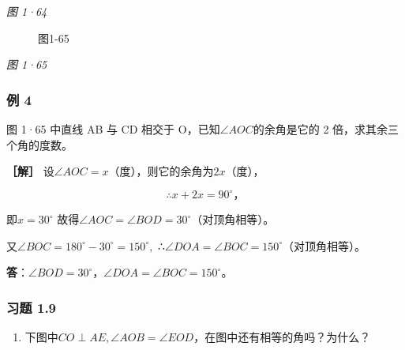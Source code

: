 \emph{图 1·64}

\begin{figure}
\centering
{}
\caption{图1-65}
\end{figure}

\emph{图 1·65}

\subsubsection{例 4}

图 1·65 中直线 AB 与 CD 相交于 O，已知\(\angle AOC\)的余角是它的 2
倍，求其余三个角的度数。

\textbf{［解］} 设\(\angle AOC = x\)（度），则它的余角为\(2x\)（度），

\[
\therefore x + 2 x = 90 ^{\circ}\text{，}
\]

即\(x = 30^{\circ}\)
故得\(\angle AOC = \angle BOD = 30^{\circ}\)（对顶角相等）。

又\(\angle BOC = 180^{\circ} - 30^{\circ} = 150^{\circ},\)
∴\(\angle DOA = \angle BOC = 150^{\circ}\)（对顶角相等）。

\textbf{答}：\(\angle BOD = 30^{\circ}\)，\(\angle DOA = \angle BOC = 150^{\circ}\)。

\subsubsection{习题 1.9}

\begin{enumerate}
\item
  下图中\(CO \perp AE, \angle AOB = \angle EOD\)，在图中还有相等的角吗？为什么？
\end{enumerate}

